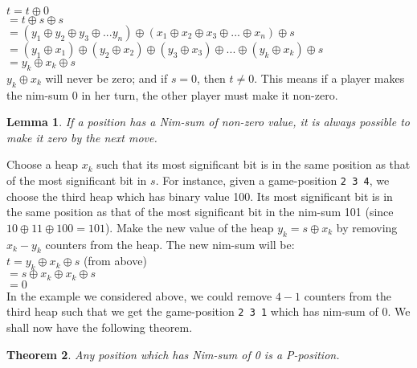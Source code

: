 \documentclass[a4paper, 12pt]{article}
\newcommand{\code}[1]{\colorbox{light-gray}{\texttt{#1}}}
\newtheorem{theorem}{Theorem}[section] %
\newtheorem{lemma}[theorem]{Lemma}
\theoremstyle{remark} %
\begin{document}
\noindent $t = t \oplus 0$\\
\hspace*{0.28cm}$=t \oplus s \oplus s$ \\
\hspace*{0.28cm}$= (y_1\oplus y_2\oplus y_3\oplus ... y_n)\oplus(x_1\oplus x_2\oplus x_3\oplus ... \oplus x_n)\oplus s $\\
\hspace*{0.28cm}$= (y_1\oplus x_1)\oplus(y_2\oplus x_2)\oplus (y_3\oplus x_3)\oplus ... \oplus(y_k\oplus x_k)\oplus s$\\
\hspace*{0.28cm}$= y_k \oplus x_k \oplus s$\\

\noindent $y_k \oplus x_k$ will never be zero; and if $s=0$, then $t \ne 0$. This means if a player makes the nim-sum $0$ in her turn, the other player must make it non-zero.

\begin{lemma}
	If a position has a Nim-sum of non-zero value, it is always possible to make it zero by the next move.
\end{lemma}

\noindent Choose a heap $x_k$ such that its most significant bit is in the same position as that of the most significant bit in $s$. For instance, given a game-position \code{2 3 4}, we choose the third heap which has binary value 100. Its most significant bit is in the same position as that of the most significant bit in the nim-sum 101 (since $10\oplus 11 \oplus 100 = 101$). Make the new value of the heap $y_k = s\oplus x_k$ by removing $x_k - y_k$ counters from the heap. The new nim-sum will be:\\

\noindent $t =  y_k \oplus x_k \oplus s$ (from above)\\
\hspace*{0.28cm}$= s\oplus x_k\oplus x_k \oplus s$\\
\hspace*{0.28cm}$= 0$\\

\noindent In the example we considered above, we could remove $4-1$ counters from the third heap such that we get the game-position \code{2 3 1} which has nim-sum of $0$. We shall now have the following theorem.

\begin{theorem}
	Any position which has Nim-sum of 0 is a P-position.
\end{theorem}
\end{document}
